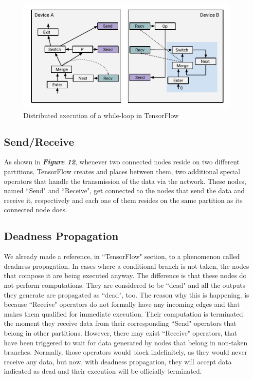 \documentclass[ack,preface]{dithesis}
\begin{document}
\begin{figure}
\centering
\includegraphics[scale=1.2]{figures/sm_iteration}
\caption{Distributed execution of a while-loop in TensorFlow}
\end{figure}


    \subsection{Send/Receive}
As shown in \textit{\textbf{Figure 12}}, whenever two connected nodes  reside on two different partitions, TensorFlow creates and places between them, two additional special operators that handle the transmission of the data via the network. These nodes, named ``Send"  and ``Receive", get connected to the nodes that send the data and receive it, respectively and each one of them resides on the same partition as its connected node does. 


    \subsection{Deadness Propagation}
We already made a reference, in ``TensorFlow" section, to a phenomenon called deadness propagation. In cases where a conditional branch is not taken, the nodes that compose it are being executed anyway. The difference is that these nodes do not perform computations. They are considered to be ``dead" and all the outputs they generate are propagated as ``dead", too. 
The reason why this is happening, is  because ``Receive" operators do not formally have any incoming edges and that makes them qualified for immediate execution. Their computation is terminated the moment they receive data from their corresponding ``Send" operators that belong in other partitions. However, there may exist ``Receive" operators, that have been triggered to wait for data generated by nodes that belong in non-taken branches. Normally, those operators would block indefinitely, as they would never receive any data, but now, with deadness propagation, they will accept data  indicated as dead and their execution will be officially terminated.
\end{document}
